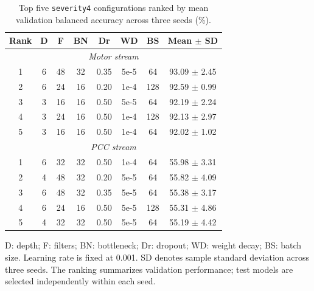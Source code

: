\documentclass[letterpaper,journal]{IEEEtran}
\begin{document}
\begin{table}[t]
\centering
\footnotesize
\caption{Top five \texttt{severity4} configurations
ranked by mean validation balanced accuracy
across three seeds (\%).}
\label{tab:search_top5_combined}
\renewcommand{\arraystretch}{1.10}
\setlength{\tabcolsep}{3pt}

\begin{tabular}{@{}cccccccc@{}}
\hline
Rank & D & F & BN & Dr & WD & BS &
Mean $\pm$ SD \\
\hline
\multicolumn{8}{c}{\textit{Motor stream}} \\
\hline
1 & 6 & 48 & 32 & 0.35 & 5e-5 &
64 & 93.09 $\pm$ 2.45 \\
2 & 6 & 24 & 16 & 0.20 & 1e-4 &
128 & 92.59 $\pm$ 0.99 \\
3 & 3 & 16 & 16 & 0.50 & 5e-5 &
64 & 92.19 $\pm$ 2.24 \\
4 & 3 & 24 & 16 & 0.50 & 1e-4 &
128 & 92.13 $\pm$ 2.97 \\
5 & 3 & 16 & 16 & 0.50 & 1e-4 &
64 & 92.02 $\pm$ 1.02 \\
\hline
\multicolumn{8}{c}{\textit{PCC stream}} \\
\hline
1 & 6 & 32 & 32 & 0.50 & 1e-4 &
64 & 55.98 $\pm$ 3.31 \\
2 & 4 & 48 & 32 & 0.20 & 5e-5 &
64 & 55.82 $\pm$ 4.09 \\
3 & 6 & 48 & 32 & 0.35 & 5e-5 &
64 & 55.38 $\pm$ 3.17 \\
4 & 6 & 24 & 16 & 0.50 & 5e-5 &
128 & 55.31 $\pm$ 4.86 \\
5 & 4 & 32 & 32 & 0.50 & 5e-5 &
64 & 55.19 $\pm$ 4.42 \\
\hline
\end{tabular}

\par\smallskip
\begin{minipage}{\columnwidth}
\scriptsize
D: depth; F: filters; BN: bottleneck;
Dr: dropout; WD: weight decay;
BS: batch size. Learning rate is fixed
at 0.001. SD denotes sample standard
deviation across three seeds.
The ranking summarizes validation performance;
test models are selected independently
within each seed.
\end{minipage}
\end{table}
\end{document}
